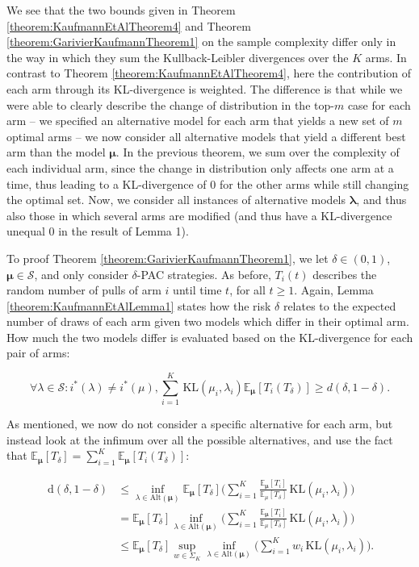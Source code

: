 \documentclass[11pt,]{article}
\newcommand{\KL}{\,\text{KL}}
\newcommand{\der}{\,\text{d}}
\begin{document}
We see that the two bounds given in Theorem
\ref{theorem:KaufmannEtAlTheorem4} and Theorem
\ref{theorem:GarivierKaufmannTheorem1} on the sample complexity differ
only in the way in which they sum the Kullback-Leibler divergences over
the \(K\) arms. In contrast to Theorem
\ref{theorem:KaufmannEtAlTheorem4}, here the contribution of each arm
through its KL-divergence is weighted. The difference is that while we
were able to clearly describe the change of distribution in the
top-\(m\) case for each arm -- we specified an alternative model for
each arm that yields a new set of \(m\) optimal arms -- we now consider
all alternative models that yield a different best arm than the model
\(\bm{\mu}\). In the previous theorem, we sum over the complexity of
each individual arm, since the change in distribution only affects one
arm at a time, thus leading to a KL-divergence of 0 for the other arms
while still changing the optimal set. Now, we consider all instances of
alternative models \(\bm{\lambda}\), and thus also those in which
several arms are modified (and thus have a KL-divergence unequal 0 in
the result of Lemma 1).

To proof Theorem \ref{theorem:GarivierKaufmannTheorem1}, we let
\(\delta \in (0,1)\), \(\bm{\mu} \in \mathcal{S}\), and only consider
\(\delta\)-PAC strategies. As before, \(T_i(t)\) describes the random
number of pulls of arm \(i\) until time \(t\), for all \(t\geq 1\).
Again, Lemma \ref{theorem:KaufmannEtAlLemma1} states how the risk
\(\delta\) relates to the expected number of draws of each arm given two
models which differ in their optimal arm. How much the two models differ
is evaluated based on the KL-divergence for each pair of arms:

\begin{equation*}
\forall \lambda \in \mathcal{S}: i^*(\lambda) \neq i^*(\mu), \sum_{i=1}^K \KL(\mu_i,\lambda_i)\mathbb{E}_{\bm{\mu}}[T_i(T_{\delta})] \geq d(\delta, 1- \delta).
\end{equation*}

As mentioned, we now do not consider a specific alternative for each
arm, but instead look at the infimum over all the possible alternatives,
and use the fact that
\(\mathbb{E}_{\bm{\mu}}[T_{\delta}] = \sum_{i=1}^K \mathbb{E}_{\bm{\mu}}[T_i(T_{\delta})]\):

\begin{align*}
\der(\delta, 1-\delta) & \leq \inf_{\lambda \in \text{Alt}(\bm{\mu})} \mathbb{E}_{\bm{\mu}}[T_{\delta}] \Big(\sum_{i=1}^K \frac{\mathbb{E}_{\bm{\mu}}[T_i]}{\mathbb{E}_{\mu}[T_{\delta}]} \KL(\mu_i, \lambda_i)\Big) \\
& = \mathbb{E}_{\bm{\mu}}[T_{\delta}] \inf_{\lambda \in \text{Alt}(\bm{\mu})} \Big(\sum_{i=1}^K \frac{\mathbb{E}_{\bm{\mu}}[T_i]}{\mathbb{E}_{\mu}[T_{\delta}]} \KL(\mu_i, \lambda_i)\Big) \\
& \leq \mathbb{E}_{\bm{\mu}}[T_{\delta}] \sup_{w \in \Sigma_K} \inf_{\lambda \in \text{Alt}(\bm{\mu})} \Big(\sum_{i=1}^K w_i \KL(\mu_i, \lambda_i)\Big).
\end{align*}
\end{document}
